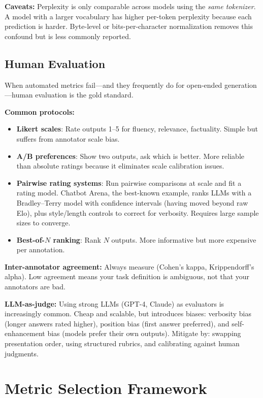 \textbf{Caveats:} Perplexity is only comparable across models using the \textit{same tokenizer}. A model with a larger vocabulary has higher per-token perplexity because each prediction is harder. Byte-level or bits-per-character normalization removes this confound but is less commonly reported.

\subsection{Human Evaluation}

When automated metrics fail---and they frequently do for open-ended generation---human evaluation is the gold standard.

\textbf{Common protocols:}
\begin{itemize}
    \item \textbf{Likert scales}: Rate outputs 1--5 for fluency, relevance, factuality. Simple but suffers from annotator scale bias.
    \item \textbf{A/B preferences}: Show two outputs, ask which is better. More reliable than absolute ratings because it eliminates scale calibration issues.
    \item \textbf{Pairwise rating systems}: Run pairwise comparisons at scale and fit a rating model. Chatbot Arena, the best-known example, ranks LLMs with a Bradley--Terry model with confidence intervals (having moved beyond raw Elo), plus style/length controls to correct for verbosity. Requires large sample sizes to converge.
    \item \textbf{Best-of-$N$ ranking}: Rank $N$ outputs. More informative but more expensive per annotation.
\end{itemize}

\textbf{Inter-annotator agreement:} Always measure (Cohen's kappa, Krippendorff's alpha). Low agreement means your task definition is ambiguous, not that your annotators are bad.

\textbf{LLM-as-judge:} Using strong LLMs (GPT-4, Claude) as evaluators is increasingly common. Cheap and scalable, but introduces biases: verbosity bias (longer answers rated higher), position bias (first answer preferred), and self-enhancement bias (models prefer their own outputs). Mitigate by: swapping presentation order, using structured rubrics, and calibrating against human judgments.

\section{Metric Selection Framework}
\label{sec:metric_selection}

